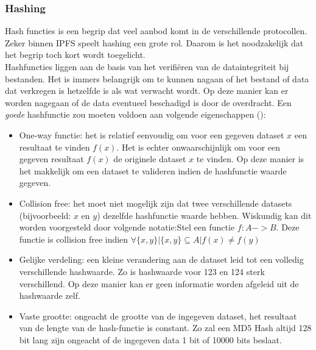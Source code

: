 \subsubsection{Hashing}
\label{hashing}
Hash functies is een begrip dat veel aanbod komt in de verschillende protocollen.  Zeker binnen IPFS speelt hashing een grote rol. Daarom is het noodzakelijk dat het begrip toch kort wordt toegelicht.\\

Hashfuncties liggen aan de basis van het verifiëren van de dataintegriteit bij bestanden. Het is immers belangrijk om te kunnen nagaan of het bestand of data dat verkregen is hetzelfde is als wat verwacht wordt. Op deze manier kan er worden nagegaan of de data eventueel beschadigd is door de overdracht. Een \textit{goede} hashfunctie zou moeten voldoen aan volgende eigenschappen (\autocite{Anderson93}):

\begin{itemize}
\item One-way functie: het is relatief eenvoudig om voor een gegeven dataset $x$ een resultaat te vinden $f(x)$. Het is echter onwaarschijnlijk om voor een gegeven resultaat $f(x)$ de originele dataset $x$ te vinden. Op deze manier is het makkelijk om een dataset te valideren indien de hashfunctie waarde gegeven.\\
\item Collision free: het moet niet mogelijk zijn dat twee verschillende datasets (bijvoorbeeld: $x$ en $y$) dezelfde hashfunctie waarde hebben. Wiskundig kan dit worden voorgesteld door volgende notatie:Stel een functie $f:A->B$. Deze functie is collision free indien $\forall \{x,y\}|\{x,y\} \subseteq A | f(x) \neq f(y)$\\
\item Gelijke verdeling: een kleine verandering aan de dataset leid tot een volledig verschillende hashwaarde. Zo is hashwaarde voor 123 en 124 sterk verschillend. Op deze manier kan er geen informatie worden afgeleid uit de hashwaarde zelf.\\
\item Vaste grootte: ongeacht de grootte van de ingegeven dataset, het resultaat van de lengte van de hash-functie is constant. Zo zal een MD5 Hash altijd 128 bit lang zijn ongeacht of de ingegeven data 1 bit of 10000 bits beslaat.
\end{itemize}


